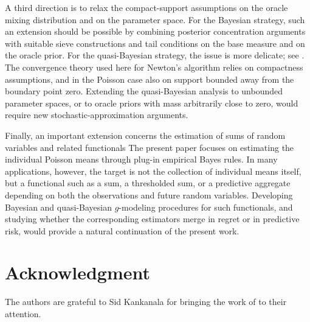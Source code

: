 \documentclass[twoside,12pt]{article}
\begin{document}
A third direction is to relax the compact-support assumptions on the oracle mixing distribution and on the parameter space. For the Bayesian strategy, such an extension should be possible by combining posterior concentration arguments with suitable sieve constructions and tail conditions on the base measure and on the oracle prior. For the quasi-Bayesian strategy, the issue is more delicate; see \citet{MarTok(09)}.  The convergence theory used here for Newton's algorithm relies on compactness assumptions, and in the Poisson case also on support bounded away from the boundary point zero. Extending the quasi-Bayesian analysis to unbounded parameter spaces, or to oracle priors with mass arbitrarily close to zero, would require new stochastic-approximation arguments.

Finally, an important extension concerns the estimation of sums of random variables and related functionals \citep{Zha(05)} The present paper focuses on estimating the individual Poisson means through plug-in empirical Bayes rules. In many applications, however, the target is not the collection of individual means itself, but a functional such as a sum, a thresholded sum, or a predictive aggregate depending on both the observations and future random variables. Developing Bayesian and quasi-Bayesian $g$-modeling procedures for such functionals, and studying whether the corresponding estimators merge in regret or in predictive risk, would provide a
natural continuation of the present work.



{}
\section*{Acknowledgment}
The authors are grateful to Sid Kankanala for bringing the work of \citet{Can(26)} to their attention.
\end{document}
